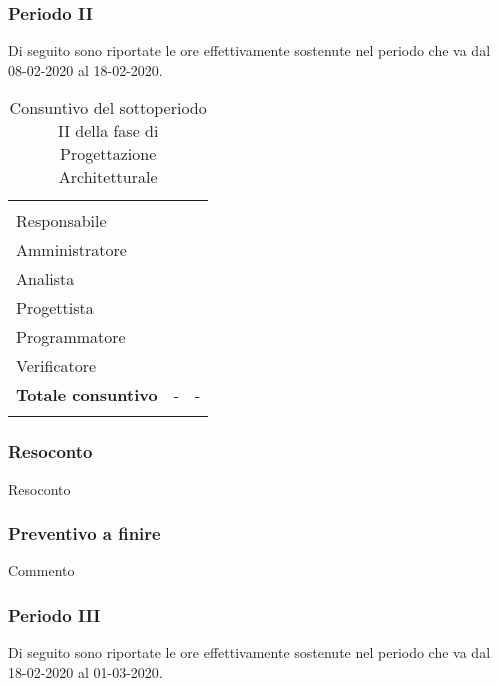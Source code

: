 \subsubsection{Periodo II}

Di seguito sono riportate le ore effettivamente sostenute nel periodo che va dal 08-02-2020 al 18-02-2020.

\begin{longtable}{ C{4cm} C{3cm} C{3.5cm}} 
 	 &
 	 &
 	 \\
 	
 	Responsabile &  & \\
 	Amministratore &  & \\
 	Analista & & \\
 	Progettista & & \\
 	Programmatore & &\\
 	Verificatore & & \\
 	
	\hline 	
 	
 	\textbf{Totale consuntivo} &
	- \color{coloreRosso}{\textbf{(+--)}} &
 	- \\	
 	
 	\caption{Consuntivo del sottoperiodo II della fase di Progettazione Architetturale}
\end{longtable}

\vspace{-1cm}

\subsubsection{Resoconto}
Resoconto
\subsubsection{Preventivo a finire}
Commento

\subsubsection{Periodo III}

Di seguito sono riportate le ore effettivamente sostenute nel periodo che va dal 18-02-2020 al 01-03-2020.

